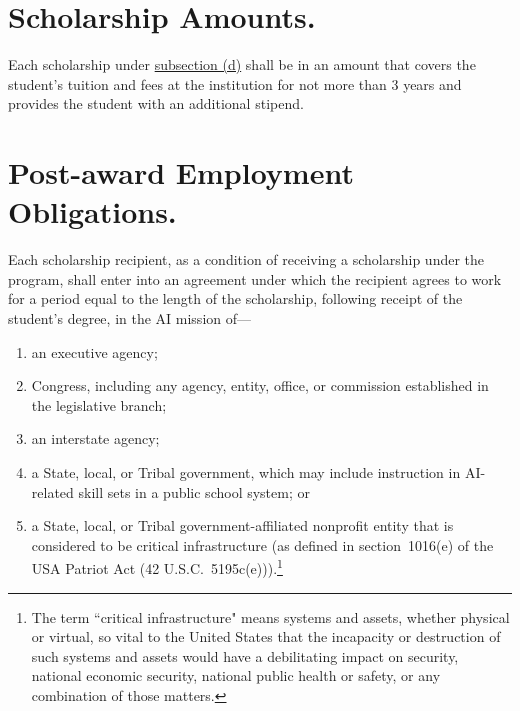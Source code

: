 \documentclass{article}
\begin{document}
    \section{Scholarship Amounts.}Each scholarship under \hyperref[sec:program]{subsection (d)} 
shall be in an amount that covers the student's tuition and fees at the 
institution for not more than 3 years and provides the student with an 
additional stipend.
    \section{Post-award Employment Obligations.}Each scholarship recipient, 
as a condition of receiving a scholarship under the program, shall 
enter into an agreement under which the recipient agrees to work for a 
period equal to the length of the scholarship, following receipt of the 
student's degree, in the AI mission of---
\begin{enumerate}
            \item an executive agency;
            \item Congress, including any agency, entity, office, or 
        commission established in the legislative branch;
            \item an interstate agency;
            \item a State, local, or Tribal government, which may include 
        instruction in AI-related skill sets in a public school system; 
        or
            \item a State, local, or Tribal government-affiliated 
        nonprofit entity that is considered to be critical 
        infrastructure (as defined in section~1016(e) of the USA 
        Patriot Act (42 U.S.C.~5195c(e))).\footnote{The term ``critical infrastructure" means systems and assets, whether physical or virtual, so vital to the United States that the incapacity or destruction of such systems and assets would have a debilitating impact on security, national economic security, national public health or safety, or any combination of those matters.}
\end{enumerate}
\end{document}
